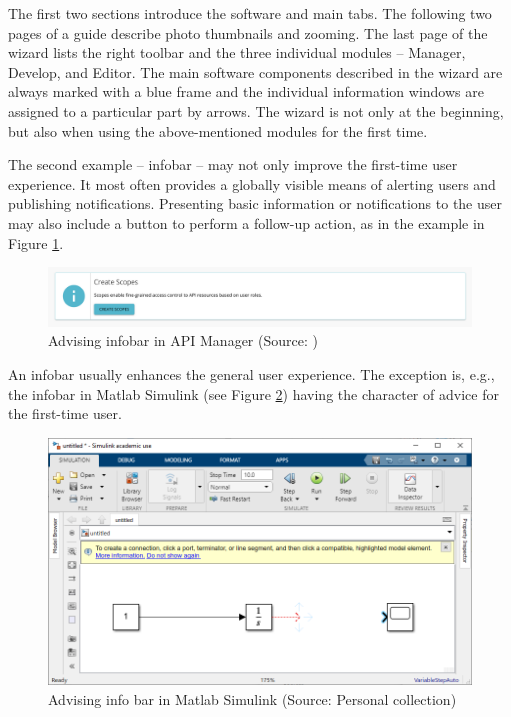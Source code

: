 \documentclass[a4paper,10pt,twoside]{article}
\begin{document}
\newpage
\noindent The first two sections introduce the software and main tabs. The following two pages of a guide describe photo thumbnails and zooming. The last page of the wizard lists the right toolbar and the three individual modules -- Manager, Develop, and Editor. The main software components described in the wizard are always marked with a blue frame and the individual information windows are assigned to a particular part by arrows. The wizard is not only at the beginning, but also when using the above-mentioned modules for the first time.

The second example -- infobar -- may not only improve the first-time user experience. It most often provides a globally visible means of alerting users and publishing notifications. Presenting basic information or notifications to the user may also include a button to perform a follow-up action, as in the example in Figure \ref{fig:info_infobar_1}.

\begin{figure}[hbt!] 
\begin{center}
\includegraphics[width=17cm]{../pictures/info_infobar_1.png} 
\caption[Advising info bar in API Manager]{Advising infobar in API Manager (Source: \cite{githubio})}
\label{fig:info_infobar_1}
\end{center}
\end{figure}

\noindent An infobar usually enhances the general user experience. The exception is, e.g., the infobar in Matlab Simulink (see Figure \ref{fig:info_advice_infobar}) having the character of advice for the first-time user.

\begin{figure}[hbt!] 
\begin{center}
\includegraphics[width=17cm]{../pictures/info_advice_infobar.png} 
\caption[Advising info bar in Matlab Simulink]{Advising  info bar in Matlab Simulink (Source: Personal collection)}
\label{fig:info_advice_infobar}
\end{center}
\end{figure}
\end{document}
